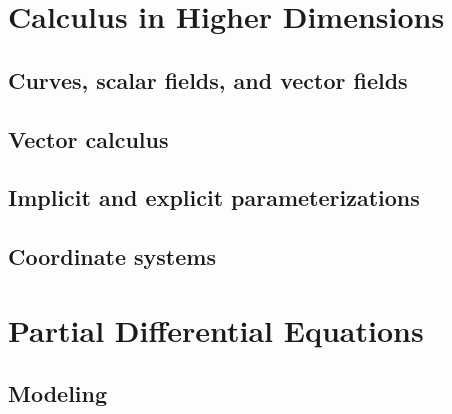\documentclass[12pt,letterpaper, openany]{book} %
\begin{document}
 
\frontmatter



%
 
\clearpage
\thispagestyle{empty}
 
\tableofcontents
 
\mainmatter

\setcounter{part}{4}

\part{Calculus in Higher Dimensions}

\chapter{Curves, scalar fields, and vector fields}


\chapter{Vector calculus}


\chapter{Implicit and explicit parameterizations}


\chapter{Coordinate systems}



\part{Partial Differential Equations}

\chapter{Modeling}

\end{document}
